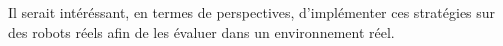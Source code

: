 \documentclass[a0paper,portrait]{baposter}
\begin{document}
\begin{poster}
{			Il serait intéréssant, en termes de perspectives, d'implémenter ces stratégies sur des robots réels afin de les évaluer dans un environnement réel.
		}
	\end{poster}
\end{document}
